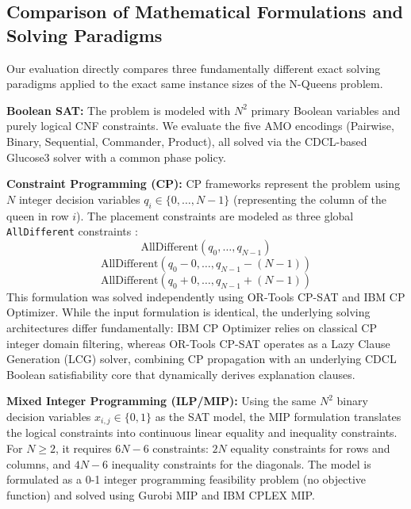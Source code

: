 \subsection{Comparison of Mathematical Formulations and Solving Paradigms}
Our evaluation directly compares three fundamentally different exact solving paradigms applied to the exact same instance sizes of the N-Queens problem.

\textbf{Boolean SAT:} The problem is modeled with $N^2$ primary Boolean variables and purely logical CNF constraints. We evaluate the five AMO encodings (Pairwise, Binary, Sequential, Commander, Product), all solved via the CDCL-based Glucose3 solver with a common phase policy.

\textbf{Constraint Programming (CP):} CP frameworks represent the problem using $N$ integer decision variables $q_i \in \{0, \dots, N-1\}$ (representing the column of the queen in row $i$). The placement constraints are modeled as three global \texttt{AllDifferent} constraints \citep{regin1994filtering}:
\begin{equation}
\text{AllDifferent}(q_0, \dots, q_{N-1})
\end{equation}
\begin{equation}
\text{AllDifferent}(q_0 - 0, \dots, q_{N-1} - (N-1))
\end{equation}
\begin{equation}
\text{AllDifferent}(q_0 + 0, \dots, q_{N-1} + (N-1))
\end{equation}
This formulation was solved independently using OR-Tools CP-SAT and IBM CP Optimizer. While the input formulation is identical, the underlying solving architectures differ fundamentally: IBM CP Optimizer relies on classical CP integer domain filtering, whereas OR-Tools CP-SAT operates as a Lazy Clause Generation (LCG) solver, combining CP propagation with an underlying CDCL Boolean satisfiability core that dynamically derives explanation clauses.

\textbf{Mixed Integer Programming (ILP/MIP):} Using the same $N^2$ binary decision variables $x_{i,j} \in \{0,1\}$ as the SAT model, the MIP formulation translates the logical constraints into continuous linear equality and inequality constraints. For $N \ge 2$, it requires $6N-6$ constraints: $2N$ equality constraints for rows and columns, and $4N-6$ inequality constraints for the diagonals. The model is formulated as a 0-1 integer programming feasibility problem (no objective function) and solved using Gurobi MIP and IBM CPLEX MIP.

